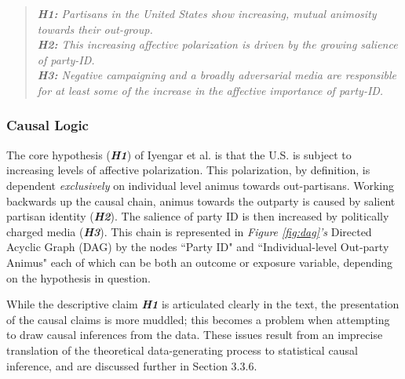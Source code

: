 \documentclass[12pt]{article}
\begin{document}
\begin{quote}
\textit{\textbf{H1:} Partisans in the United States show increasing, mutual animosity towards their out-group.}
\\\textit{\textbf{H2:} This increasing affective polarization is driven by the growing salience of party-ID.}
\\\textit{\textbf{H3:} Negative campaigning and a broadly adversarial media are responsible for at least some of the increase in the affective importance of party-ID.}
\end{quote}

\subsubsection{Causal Logic}
The core hypothesis (\textit{\textbf{H1}}) of Iyengar et al. is that the U.S. is subject to increasing levels of affective polarization. This polarization, by definition, is dependent \textit{exclusively} on individual level animus towards out-partisans. Working backwards up the causal chain, animus towards the outparty is caused by salient partisan identity (\textit{\textbf{H2}}). The salience of party ID is then increased by politically charged media (\textit{\textbf{H3}}). This chain is represented in \textit{Figure \ref{fig:dag}'s} Directed Acyclic Graph (DAG) by the nodes ``Party ID" and ``Individual-level Out-party Animus" each of which can be both an outcome or exposure variable, depending on the hypothesis in question.

While the descriptive claim \textbf{\textit{H1}} is articulated clearly in the text, the presentation of the causal claims is more muddled; this becomes a problem when attempting to draw causal inferences from the data. These issues result from an imprecise translation of the theoretical data-generating process to statistical causal inference, and are discussed further in Section 3.3.6.
\end{document}
